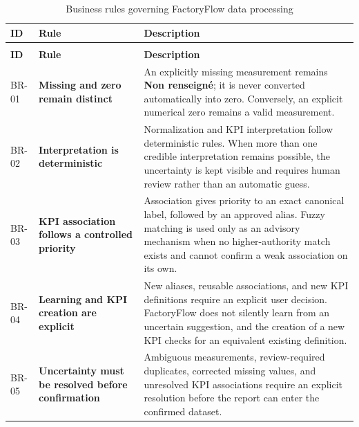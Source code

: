 \begin{longtable}{
    |>{\centering\arraybackslash\bfseries}p{}
    |>{\raggedright\arraybackslash\bfseries}p{}
    |>{\raggedright\arraybackslash}p{}|
}

\caption{Business rules governing FactoryFlow data processing}
\label{tab:business-rules}
\\

\hline
\textbf{ID} & \textbf{Rule} & \textbf{Description}
\\
\hline
\endfirsthead

\multicolumn{3}{c}{
    \textit{Table~\ref{tab:business-rules} -- continued}
}
\\[4pt]

\hline
\textbf{ID} & \textbf{Rule} & \textbf{Description}
\\
\hline
\endhead

BR-01
&
Missing and zero remain distinct
&
An explicitly missing measurement remains \textbf{Non renseigné}; it is never
converted automatically into zero. Conversely, an explicit numerical zero
remains a valid measurement.
\\
\hline

BR-02
&
Interpretation is deterministic
&
Normalization and KPI interpretation follow deterministic rules. When more
than one credible interpretation remains possible, the uncertainty is kept
visible and requires human review rather than an automatic guess.
\\
\hline

BR-03
&
KPI association follows a controlled priority
&
Association gives priority to an exact canonical label, followed by an
approved alias. Fuzzy matching is used only as an advisory mechanism when no
higher-authority match exists and cannot confirm a weak association on its
own.
\\
\hline

BR-04
&
Learning and KPI creation are explicit
&
New aliases, reusable associations, and new KPI definitions require an
explicit user decision. FactoryFlow does not silently learn from an uncertain
suggestion, and the creation of a new KPI checks for an equivalent existing
definition.
\\
\hline

BR-05
&
Uncertainty must be resolved before confirmation
&
Ambiguous measurements, review-required duplicates, corrected missing values,
and unresolved KPI associations require an explicit resolution before the
report can enter the confirmed dataset.
\\
\hline


\end{longtable}
